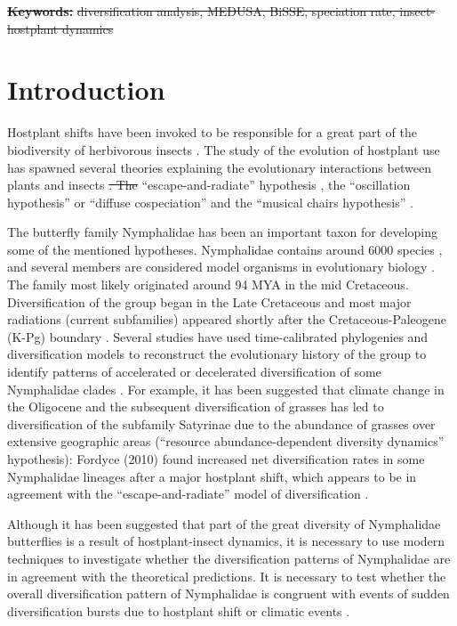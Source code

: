\documentclass[10pt,letterpaper]{article} %
\providecommand{\DIFadd}[1]{{\protect\color{blue}\uwave{#1}}} %
\providecommand{\DIFdel}[1]{{\protect\color{red}\sout{#1}}}                      %
\providecommand{\DIFaddbegin}{} %
\providecommand{\DIFaddend}{} %
\providecommand{\DIFdelbegin}{} %
\providecommand{\DIFdelend}{} %
\begin{document}
\DIFdelbegin \textbf{\DIFdel{Keywords:}} %
\DIFdel{diversification analysis, MEDUSA, BiSSE, speciation
rate, insect-hostplant dynamics
}\DIFdelend \DIFaddbegin \linenumbers
\DIFaddend 

\section*{Introduction}
\DIFdelbegin %

\DIFdelend Hostplant shifts have been invoked to be responsible for a great part of
the biodiversity of herbivorous insects \cite{mitter1988}. The study of the
evolution of hostplant use has spawned several theories explaining the
evolutionary interactions between plants and insects \cite{nyman2012}\DIFdelbegin \DIFdel{. The
}\DIFdelend \DIFaddbegin \DIFadd{: the
}\DIFaddend ``escape-and-radiate'' hypothesis \cite{ehrlich1964}, the ``oscillation
hypothesis'' \cite{janz2011, nylin2014} or ``diffuse cospeciation'' \cite{nyman2012} and the
``musical chairs hypothesis'' \cite{hardy2014}.

The butterfly family Nymphalidae has been an important taxon for
developing some of the mentioned hypotheses. Nymphalidae contains around
6000 species \cite{van_nieukerken2011}, and several members are considered model organisms
in evolutionary biology \cite{joron2006, willmott2006, brakefield2009}.
The family most likely originated
around 94 MYA in the mid Cretaceous. Diversification of the group began
in the Late Cretaceous and most major radiations (current subfamilies)
appeared shortly after the Cretaceous-Paleogene (K-Pg) boundary
\cite{heikkila2012}. Several studies have used time-calibrated phylogenies and
diversification models to reconstruct the evolutionary history of the
group to identify patterns of accelerated or decelerated diversification
of some Nymphalidae clades \cite{heikkila2012, elias2009, fordyce2010, wahlberg2009}.
For example, it has been
suggested that climate change in the Oligocene and the subsequent
diversification of grasses has led to diversification of the subfamily
Satyrinae \cite{pena2008} due to the abundance of grasses over extensive
geographic areas (``resource abundance-dependent diversity dynamics''
hypothesis): Fordyce (2010) \cite{fordyce2010} found increased net diversification
rates in some Nymphalidae lineages after a major hostplant shift, which
appears to be in agreement with the ``escape-and-radiate'' model of
diversification \cite{ehrlich1964}.

Although it has been suggested that part of the great diversity of
Nymphalidae butterflies is a result of hostplant-insect dynamics, it is
necessary to use modern techniques to investigate whether the
diversification patterns of Nymphalidae are in agreement with the
theoretical predictions. It is necessary to test whether the overall
diversification pattern of Nymphalidae is congruent with events of
sudden diversification bursts due to hostplant shift or climatic events
\cite{nylin2014, ferrer2013}.
\end{document}
